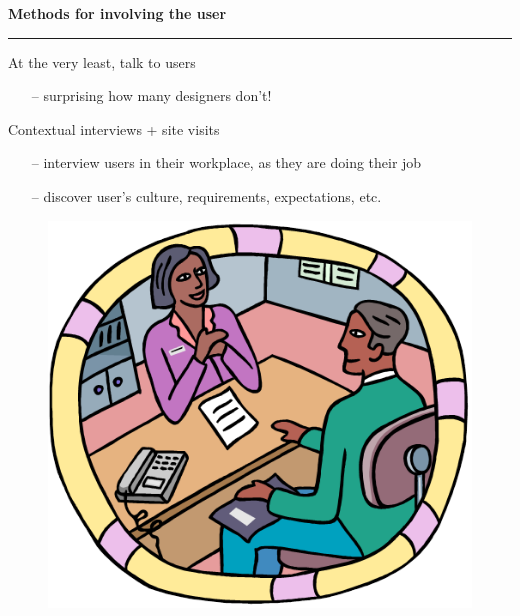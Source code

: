 \documentclass[pdf]{beamer}
\begin{document}
\begin{frame}
\vspace{8mm}
\textcolor{myBlue}{\textbf{\Large{Methods for involving the user}}}

\textcolor{red}{\rule{10cm}{1mm}}

\bigskip

{\LARGE At the very least, talk to users \LARGE}

\begin{itemize}
    \item[\textcolor{black}{--}] surprising how many designers don’t!
\end{itemize}

\bigskip

{\LARGE Contextual interviews + site visits \LARGE}
\begin{itemize}
    \item[\textcolor{black}{--}] interview users in their workplace, as they are doing their job
    \item[\textcolor{black}{--}] discover user's culture, requirements, expectations, etc.

\end{itemize}

\begin{figure}[b]
    	\begin{flushright}
    	\includegraphics[scale = 0.5]{9.PNG}
        \end{flushright}
        \end{figure}
\end{frame}
\end{document}
